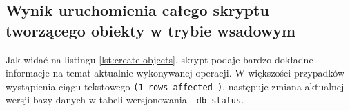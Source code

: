 \subsection{Wynik uruchomienia całego skryptu tworzącego obiekty w trybie wsadowym}

Jak widać na listingu \ref{lst:create-objects}, skrypt podaje bardzo dokładne informacje na temat aktualnie wykonywanej operacji. W większości przypadków wystąpienia ciągu tekstowego \texttt{(1 rows affected )}, następuje zmiana aktualnej wersji bazy danych w tabeli wersjonowania - \texttt{db\_status}.

